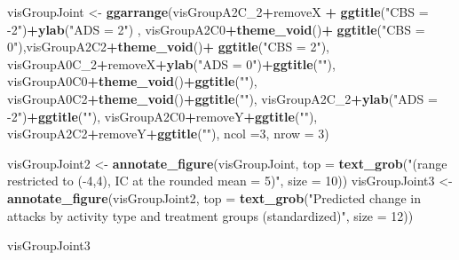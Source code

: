 \documentclass[10pt,dvipsnames,enabledeprecatedfontcommands]{scrartcl}
\newenvironment{Shaded}{\begin{snugshade}}{\end{snugshade}}
\newcommand{\KeywordTok}[1]{\textcolor[rgb]{0.13,0.29,0.53}{\textbf{#1}}}
\newcommand{\DataTypeTok}[1]{\textcolor[rgb]{0.13,0.29,0.53}{#1}}
\newcommand{\DecValTok}[1]{\textcolor[rgb]{0.00,0.00,0.81}{#1}}
\newcommand{\StringTok}[1]{\textcolor[rgb]{0.31,0.60,0.02}{#1}}
\newcommand{\OperatorTok}[1]{\textcolor[rgb]{0.81,0.36,0.00}{\textbf{#1}}}
\newcommand{\NormalTok}[1]{#1}
\begin{document}
\begin{Shaded}
\begin{Highlighting}[]
\NormalTok{visGroupJoint <-}\StringTok{ }\KeywordTok{ggarrange}\NormalTok{(visGroupA2C_}\DecValTok{2}\OperatorTok{+}\NormalTok{removeX }\OperatorTok{+}\StringTok{ }\KeywordTok{ggtitle}\NormalTok{(}\StringTok{"CBS = -2"}\NormalTok{)}\OperatorTok{+}\KeywordTok{ylab}\NormalTok{(}\StringTok{"ADS = 2"}\NormalTok{) , visGroupA2C0}\OperatorTok{+}\KeywordTok{theme_void}\NormalTok{()}\OperatorTok{+}\StringTok{ }\KeywordTok{ggtitle}\NormalTok{(}\StringTok{"CBS = 0"}\NormalTok{),visGroupA2C2}\OperatorTok{+}\KeywordTok{theme_void}\NormalTok{()}\OperatorTok{+}\StringTok{ }\KeywordTok{ggtitle}\NormalTok{(}\StringTok{"CBS = 2"}\NormalTok{), }
\NormalTok{          visGroupA0C_}\DecValTok{2}\OperatorTok{+}\NormalTok{removeX}\OperatorTok{+}\KeywordTok{ylab}\NormalTok{(}\StringTok{"ADS = 0"}\NormalTok{)}\OperatorTok{+}\KeywordTok{ggtitle}\NormalTok{(}\StringTok{""}\NormalTok{), visGroupA0C0}\OperatorTok{+}\KeywordTok{theme_void}\NormalTok{()}\OperatorTok{+}\KeywordTok{ggtitle}\NormalTok{(}\StringTok{""}\NormalTok{), visGroupA0C2}\OperatorTok{+}\KeywordTok{theme_void}\NormalTok{()}\OperatorTok{+}\KeywordTok{ggtitle}\NormalTok{(}\StringTok{""}\NormalTok{),}
\NormalTok{          visGroupA2C_}\DecValTok{2}\OperatorTok{+}\KeywordTok{ylab}\NormalTok{(}\StringTok{"ADS = -2"}\NormalTok{)}\OperatorTok{+}\KeywordTok{ggtitle}\NormalTok{(}\StringTok{""}\NormalTok{), visGroupA2C0}\OperatorTok{+}\NormalTok{removeY}\OperatorTok{+}\KeywordTok{ggtitle}\NormalTok{(}\StringTok{""}\NormalTok{), visGroupA2C2}\OperatorTok{+}\NormalTok{removeY}\OperatorTok{+}\KeywordTok{ggtitle}\NormalTok{(}\StringTok{""}\NormalTok{), }\DataTypeTok{ncol =}\DecValTok{3}\NormalTok{, }\DataTypeTok{nrow =} \DecValTok{3}\NormalTok{)}

 
\NormalTok{visGroupJoint2 <-}\StringTok{ }\KeywordTok{annotate_figure}\NormalTok{(visGroupJoint, }
  \DataTypeTok{top =} \KeywordTok{text_grob}\NormalTok{(}\StringTok{"(range restricted to (-4,4), IC at the rounded mean = 5)"}\NormalTok{,}
                  \DataTypeTok{size =} \DecValTok{10}\NormalTok{))}
\NormalTok{visGroupJoint3 <-}\StringTok{ }\KeywordTok{annotate_figure}\NormalTok{(visGroupJoint2, }
  \DataTypeTok{top =} \KeywordTok{text_grob}\NormalTok{(}\StringTok{"Predicted change in attacks by activity type and treatment groups (standardized)"}\NormalTok{,}
                  \DataTypeTok{size =} \DecValTok{12}\NormalTok{))}

\NormalTok{visGroupJoint3 }
\end{Highlighting}
\end{Shaded}
\end{document}
